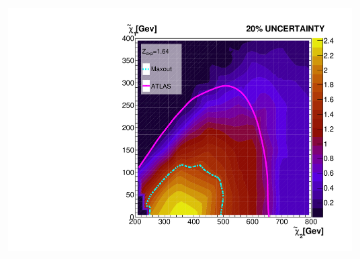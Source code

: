 \begin{figure}[H]
{\begin{subfigure}{.45\textwidth}
        \includegraphics[width=\textwidth]{Figures/MLResults/NN/SUSY/Comparison/Limits/MaxOutLimit20.pdf}
        \vspace{-0.75cm}
        \vspace*{-33.1ex}  %
        \begin{center}
        \tiny
        \hspace{-44.5ex}
        \cite{atlas_search_2021}
        \end{center}
        \vspace*{34.1ex}
        \vspace{-1.cm}
        \caption{}
        \label{fig:MaxOutLimit20}
    \end{subfigure}
    }
\end{figure}
